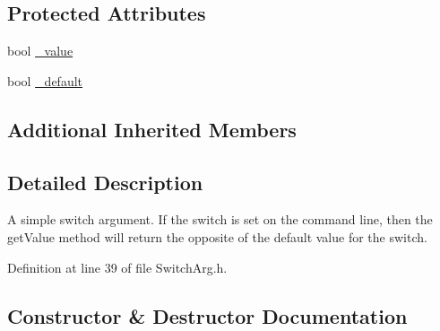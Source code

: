 \subsection*{Protected Attributes}
\begin{DoxyCompactItemize}
\item 
bool \hyperlink{class_t_c_l_a_p_1_1_switch_arg_a0389ecebecc504d9756703d46e8cf3ca}{\+\_\+value}
\item 
bool \hyperlink{class_t_c_l_a_p_1_1_switch_arg_ae25a99eb06fc2ee75a3b98edba1d5d8d}{\+\_\+default}
\end{DoxyCompactItemize}
\subsection*{Additional Inherited Members}


\subsection{Detailed Description}
A simple switch argument. If the switch is set on the command line, then the get\+Value method will return the opposite of the default value for the switch. 

Definition at line 39 of file Switch\+Arg.\+h.



\subsection{Constructor \& Destructor Documentation}
\hypertarget{class_t_c_l_a_p_1_1_switch_arg_a3895b036fa2d36e4fcfa41dfcdb298c1}{}

